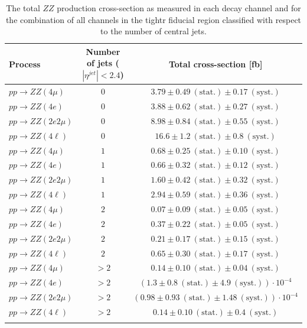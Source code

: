  \begin{table}[htbH]
\begin{center}
\caption{\footnotesize{The total $ZZ$ production cross-section as measured in each decay channel and for the combination of all channels in the tightr fiducial region classified with respect to the number of central jets.}}
\label{tab:xs_ncentraljets_fr}
\begin{tabular}{lcc}
\hline Process & Number of jets ($|\eta^{jet}|<2.4$) &  Total cross-section [fb]\\
\hline $pp\to ZZ(4\mu) $ & $ 0 $ & $3.79\pm 0.49~\mathrm{(stat.)}\pm 0.17~\mathrm{(syst.)}$\\
$pp\to ZZ(4e) $ & $  0 $ & $3.88\pm 0.62~\mathrm{(stat.)}\pm 0.27~\mathrm{(syst.)}$\\
$pp\to ZZ(2e2\mu)$ & $ 0 $ &  $8.98\pm 0.84~\mathrm{(stat.)}\pm 0.55~\mathrm{(syst.)}$\\
\hline
\textbf{$pp\to ZZ(4\ell)$} & $0$ & $16.6 \pm 1.2~\mathrm{(stat.)}\pm 0.8~\mathrm{(syst.)}$ \\
\hline
$pp\to ZZ(4\mu) $ & $1$ & $0.68\pm 0.25~\mathrm{(stat.)}\pm 0.10~\mathrm{(syst.)}$\\
$pp\to ZZ(4e) $ &  $1$ & $0.66\pm 0.32~\mathrm{(stat.)}\pm 0.12~\mathrm{(syst.)}$\\
$pp\to ZZ(2e2\mu)$ & $1$ & $1.60\pm 0.42~\mathrm{(stat.)}\pm 0.32~\mathrm{(syst.)}$\\
\hline
\textbf{$pp\to ZZ(4\ell)$} & $1$ & $2.94 \pm 0.59~\mathrm{(stat.)}\pm 0.36~\mathrm{(syst.)}$ \\
\hline 
$pp\to ZZ(4\mu) $ & $2$ & $0.07\pm 0.09~\mathrm{(stat.)}\pm 0.05~\mathrm{(syst.)}$\\
$pp\to ZZ(4e) $ &  $2$ & $0.37\pm 0.22~\mathrm{(stat.)}\pm 0.05~\mathrm{(syst.)}$\\
$pp\to ZZ(2e2\mu)$ & $2$ & $0.21\pm 0.17~\mathrm{(stat.)}\pm 0.15~\mathrm{(syst.)}$\\
\hline
\textbf{$pp\to ZZ(4\ell)$} & $2$ & $0.65 \pm 0.30~\mathrm{(stat.)}\pm 0.17~\mathrm{(syst.)}$ \\
\hline 
$pp\to ZZ(4\mu) $ & $>2$ & $0.14\pm 0.10~\mathrm{(stat.)}\pm 0.04~\mathrm{(syst.)}$\\
$pp\to ZZ(4e) $ & $>2$ & $(1.3\pm 0.8~\mathrm{(stat.)}\pm 4.9~\mathrm{(syst.)}) \cdot 10^{-4}$\\
$pp\to ZZ(2e2\mu)$ & $>2$ & $(0.98 \pm 0.93~\mathrm{(stat.)}\pm 1.48~\mathrm{(syst.)})\cdot 10^{-4}$\\
\hline
\textbf{$pp\to ZZ(4\ell)$} & $>2$ & $0.14\pm 0.10~\mathrm{(stat.)} \pm 0.4~\mathrm{(syst.)}$ \\
\hline \\
\end{tabular}%
\end{center}
\end{table}
\clearpage

